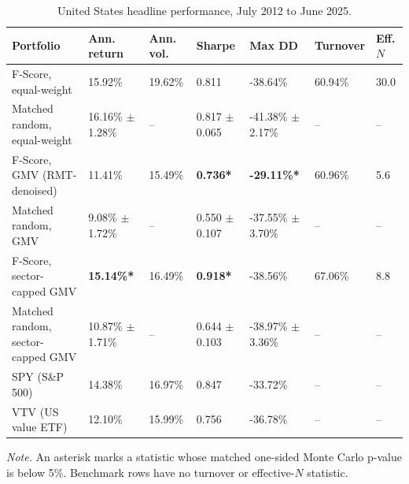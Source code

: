 \documentclass[11pt,a4paper]{report}
\numberwithin{figure}{chapter}
\numberwithin{table}{chapter}
\numberwithin{equation}{chapter}
\begin{document}
\begin{table}[H]
\centering
\scriptsize
\caption{United States headline performance, July 2012 to June 2025.}
\label{tab:us_headline}

\setlength{\tabcolsep}{2.5pt}

\begin{tabular}{
@{}
M{0.21\textwidth}
M{0.13\textwidth}
M{0.09\textwidth}
M{0.12\textwidth}
M{0.13\textwidth}
M{0.09\textwidth}
M{0.06\textwidth}
@{}
}
\hline
\textbf{Portfolio} &
\textbf{Ann. return} &
\textbf{Ann. vol.} &
\textbf{Sharpe} &
\textbf{Max DD} &
\textbf{Turnover} &
\textbf{Eff. $N$} \\
\hline

F-Score, equal-weight
& 15.92\%
& 19.62\%
& 0.811
& -38.64\%
& 60.94\%
& 30.0 \\
\hline{}

Matched random, equal-weight
& 16.16\% $\pm$ 1.28\%
& --
& 0.817 $\pm$ 0.065
& -41.38\% $\pm$ 2.17\%
& --
& -- \\
\hline{}

F-Score, GMV (RMT-denoised)
& 11.41\%
& 15.49\%
& \textbf{0.736*}
& \textbf{-29.11\%*}
& 60.96\%
& 5.6 \\
\hline{}

Matched random, GMV
& 9.08\% $\pm$ 1.72\%
& --
& 0.550 $\pm$ 0.107
& -37.55\% $\pm$ 3.70\%
& --
& -- \\
\hline{}

F-Score, sector-capped GMV
& \textbf{15.14\%*}
& 16.49\%
& \textbf{0.918*}
& -38.56\%
& 67.06\%
& 8.8 \\
\hline{}

Matched random, sector-capped GMV
& 10.87\% $\pm$ 1.71\%
& --
& 0.644 $\pm$ 0.103
& -38.97\% $\pm$ 3.36\%
& --
& -- \\
\hline{}

SPY (S\&P 500)
& 14.38\%
& 16.97\%
& 0.847
& -33.72\%
& --
& -- \\
\hline{}

VTV (US value ETF)
& 12.10\%
& 15.99\%
& 0.756
& -36.78\%
& --
& -- \\

\hline
\end{tabular}

\vspace{0.05cm}

\begin{minipage}{0.98\textwidth}
\scriptsize
\textit{Note.} An asterisk marks a statistic whose matched one-sided Monte Carlo p-value is below 5\%. Benchmark rows have no turnover or effective-$N$ statistic.
\end{minipage}
\end{table}
\end{document}
